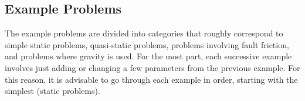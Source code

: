 \subsection{Example Problems}

The example problems are divided into categories that roughly correspond
to simple static problems, quasi-static problems, problems involving
fault friction, and problems where gravity is used. For the most part,
each successive example involves just adding or changing a few parameters
from the previous example. For this reason, it is advisable to go
through each example in order, starting with the simplest (static
problems).


